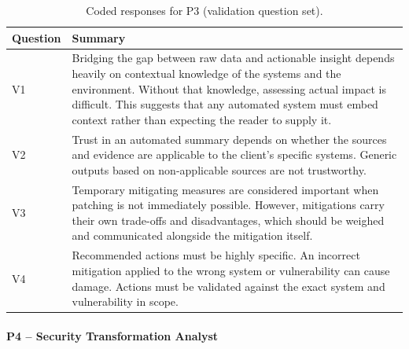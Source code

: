 \begin{table}[h]
\centering
\begin{tabular}{@{}lp{}@{}}
\toprule
\textbf{Question} & \textbf{Summary} \\
\midrule
V1 & Bridging the gap between raw data and actionable insight depends heavily on contextual knowledge of the systems and the environment. Without that knowledge, assessing actual impact is difficult. This suggests that any automated system must embed context rather than expecting the reader to supply it. \\
\midrule
V2 & Trust in an automated summary depends on whether the sources and evidence are applicable to the client's specific systems. Generic outputs based on non-applicable sources are not trustworthy. \\
\midrule
V3 & Temporary mitigating measures are considered important when patching is not immediately possible. However, mitigations carry their own trade-offs and disadvantages, which should be weighed and communicated alongside the mitigation itself. \\
\midrule
V4 & Recommended actions must be highly specific. An incorrect mitigation applied to the wrong system or vulnerability can cause damage. Actions must be validated against the exact system and vulnerability in scope. \\
\bottomrule
\end{tabular}
\caption{Coded responses for P3 (validation question set).}
\label{tab:p3-responses}
\end{table}

\paragraph{P4 -- Security Transformation Analyst}

